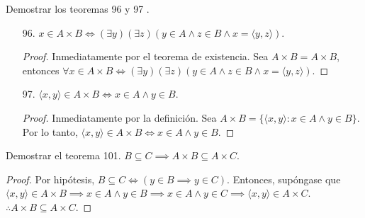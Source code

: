 	\begin{problema}
	 Demostrar los teoremas 96 y 97 .\begin{enumerate}
	 	\item[96.] $x\in A\times B\iff (\exists y)(\exists z)(y\in A\wedge z\in B\wedge x=\langle y, z\rangle)$.
	 	\begin{proof}
	 		Inmediatamente por el teorema de existencia. Sea $A\times B = A\times B$, entonces 
	 		$\forall x\in A\times B\iff (\exists y)(\exists z)(y\in A\wedge z\in B\wedge x=\langle y, z\rangle)$.
	 	\end{proof}
	 	
	 	\item[97.] $\langle x,y\rangle \in A\times B \iff x\in A \wedge y\in B$.
	 	\begin{proof}
	 		Inmediatamente por la definición. Sea $A\times B=\{\langle x,y\rangle: x\in A\wedge y\in B\}$. Por lo tanto, $\langle x,y\rangle \in A\times B \iff x\in A \wedge y\in B$.
	 	\end{proof}
	 	
	 \end{enumerate}
\end{problema}


\begin{problema}
	Demostrar el teorema 101. $B\subseteq C\implies A\times B\subseteq A\times C$.
\end{problema}
\begin{proof}
	Por hipótesis, $B\subseteq C\iff (y\in B\implies y\in C)$. Entonces, supóngase que $\langle x,y\rangle \in A\times B\implies x\in A\wedge y\in B\implies x\in A\wedge y\in C\implies\langle x,y\rangle \in A\times C $. $\therefore A\times B\subseteq A\times C$. 
\end{proof}


